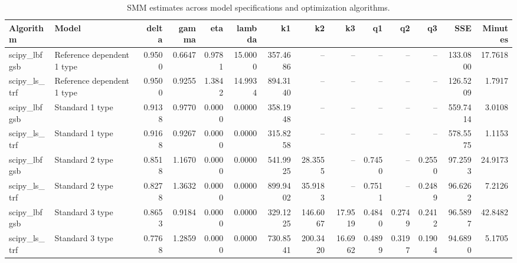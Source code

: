\begin{table}
\caption{SMM estimates across model specifications and optimization algorithms.}
\label{tab:all_estimates}
\begin{tabular}{llrrrrrrrrrrrr}
\toprule
Algorithm & Model & delta & gamma & eta & lambda & k1 & k2 & k3 & q1 & q2 & q3 & SSE & Minutes \\
\midrule
scipy_lbfgsb & Reference dependent 1 type & 0.9500 & 0.6647 & 0.9781 & 15.0000 & 357.4686 & -- & -- & -- & -- & -- & 133.0800 & 17.7618 \\
scipy_ls_trf & Reference dependent 1 type & 0.9500 & 0.9255 & 1.3842 & 14.9934 & 894.3140 & -- & -- & -- & -- & -- & 126.5209 & 1.7917 \\
scipy_lbfgsb & Standard 1 type & 0.9138 & 0.9770 & 0.0000 & 0.0000 & 358.1948 & -- & -- & -- & -- & -- & 559.7414 & 3.0108 \\
scipy_ls_trf & Standard 1 type & 0.9168 & 0.9267 & 0.0000 & 0.0000 & 315.8258 & -- & -- & -- & -- & -- & 578.5575 & 1.1153 \\
scipy_lbfgsb & Standard 2 type & 0.8518 & 1.1670 & 0.0000 & 0.0000 & 541.9925 & 28.3555 & -- & 0.7450 & -- & 0.2550 & 97.2593 & 24.9173 \\
scipy_ls_trf & Standard 2 type & 0.8278 & 1.3632 & 0.0000 & 0.0000 & 899.9402 & 35.9183 & -- & 0.7511 & -- & 0.2489 & 96.6262 & 7.2126 \\
scipy_lbfgsb & Standard 3 type & 0.8653 & 0.9184 & 0.0000 & 0.0000 & 329.1225 & 146.6067 & 17.9519 & 0.4840 & 0.2749 & 0.2412 & 96.5897 & 42.8482 \\
scipy_ls_trf & Standard 3 type & 0.7768 & 1.2859 & 0.0000 & 0.0000 & 730.8541 & 200.3420 & 16.6962 & 0.4899 & 0.3197 & 0.1904 & 94.6890 & 5.1705 \\
\bottomrule
\end{tabular}
\end{table}
